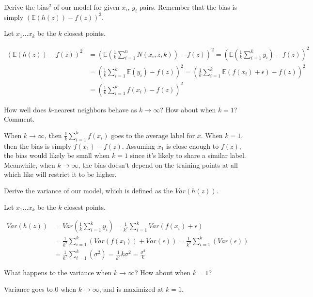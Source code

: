 \begin{Parts}
\Part Derive the bias$^2$ of our model for given $x_i$, $y_i$ pairs. Remember that the bias is simply $(\mathbb{E}(h(z)) - f(z))^2$.

\begin{solution}
Let $x_1 \ldots x_k$ be the $k$ closest points. 


\begin{align*}
(\mathbb{E}(h(z)) - f(z))^2 &= (\mathbb{E}( \frac{1}{k} \sum_{i=1}^n N(x_i, z, k)) - f(z))^2 = (\mathbb{E}( \frac{1}{k} \sum_{i=1}^k y_i) - f(z))^2 \\
&= (\frac{1}{k} \sum_{i=1}^k \mathbb{E}(y_i) - f(z))^2 = (\frac{1}{k} \sum_{i=1}^k \mathbb{E}(f(x_i) + \epsilon) - f(z))^2 \\
&= (\frac{1}{k} \sum_{i=1}^k f(x_i) - f(z))^2
\end{align*}

\end{solution}

\Part How well does $k$-nearest neighbors behave as $k \longrightarrow \infty$? How about when $k = 1$? Comment.

\begin{solution}
When $k \longrightarrow \infty$, then $\frac{1}{k} \sum_{i=1}^k f(x_i)$ goes to the average label for $x$. When $k = 1$, then the bias is simply $f(x_1) - f(z)$. Assuming $x_1$ is close enough to $f(z)$, the bias would likely be small when $k = 1$ since it's likely to share a similar label. Meanwhile, when $k \longrightarrow \infty$, the bias doesn't depend on the training points at all which like will restrict it to be higher.
\end{solution}

\Part Derive the variance of our model, which is defined as the $Var(h(z))$.

\begin{solution}
Let $x_1 \ldots x_k$ be the $k$ closest points. 

\begin{align*}
Var(h(z)) &= Var(\frac{1}{k} \sum_{i=1}^k y_i) = \frac{1}{k^2} \sum_{i=1}^k Var(f(x_i) + \epsilon) \\
&= \frac{1}{k^2} \sum_{i=1}^k (Var(f(x_i)) + Var(\epsilon)) = \frac{1}{k^2} \sum_{i=1}^k (Var(\epsilon)) \\
&= \frac{1}{k^2} \sum_{i=1}^k (\sigma^2) = \frac{1}{k^2} k \sigma^2 = \frac{\sigma^2}{k} 
\end{align*}
\end{solution}


\Part What happens to the variance when $k \longrightarrow \infty$? How about when $k = 1$?

\begin{solution}

Variance goes to 0 when $k \longrightarrow \infty$, and is maximized at $k = 1$.
\end{solution}

\end{Parts}

\newpage